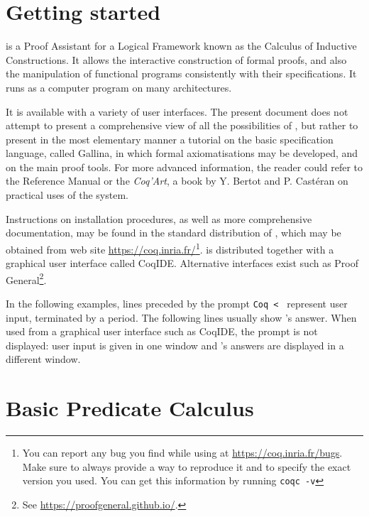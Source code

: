 \documentclass[11pt,a4paper]{book}
\begin{document}


\chapter*{Getting started}

\Coq{} is a Proof Assistant for a Logical Framework known as the Calculus
of Inductive Constructions. It allows the interactive construction of
formal proofs, and also the manipulation of functional programs
consistently with their specifications. It runs as a computer program
on many architectures.

It is available with a variety of user interfaces. The present
document does not attempt to present a comprehensive view of all the
possibilities of \Coq, but rather to present in the most elementary
manner a tutorial on the basic specification language, called Gallina,
in which formal axiomatisations may be developed, and on the main
proof tools.  For more advanced information, the reader could refer to
the \Coq{} Reference Manual or the \textit{Coq'Art}, a book by Y.
Bertot and P. Castéran on practical uses of the \Coq{} system.

Instructions on installation procedures, as well as more comprehensive
documentation, may be found in the standard distribution of \Coq,
which may be obtained from \Coq{} web site
\url{https://coq.inria.fr/}\footnote{You can report any bug you find
while using \Coq{} at \url{https://coq.inria.fr/bugs}. Make sure to
always provide a way to reproduce it and to specify the exact version
you used. You can get this information by running \texttt{coqc -v}}.
\Coq{} is distributed together with a graphical user interface called
CoqIDE. Alternative interfaces exist such as
Proof General\footnote{See \url{https://proofgeneral.github.io/}.}.

In the following examples, lines preceded by the prompt \verb:Coq < :
represent user input, terminated by a period.
The following lines usually show \Coq's answer.
When used from a graphical user interface such as
CoqIDE, the prompt is not displayed: user input is given in one window
and \Coq's answers are displayed in a different window.

\chapter{Basic Predicate Calculus}
\end{document}

